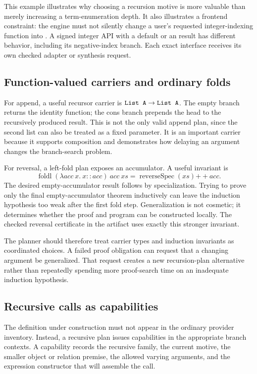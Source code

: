 \documentclass[11pt,letterpaper]{article}
\newcommand{\id}[1]{\texttt{\detokenize{#1}}}
\theoremstyle{definition}
\theoremstyle{remark}
\begin{document}
This example illustrates why choosing a recursion motive is more valuable than merely increasing a term-enumeration depth. It also illustrates a frontend constraint: the engine must not silently change a user's requested integer-indexing function into \id{lookupFin}. A signed integer API with a default or an \id{Option} result has different behavior, including its negative-index branch. Each exact interface receives its own checked adapter or synthesis request.

\subsection{Function-valued carriers and ordinary folds}

For append, a useful recursor carrier is $\id{List A} \to \id{List A}$. The empty branch returns the identity function; the cons branch prepends the head to the recursively produced result. This is not the only valid append plan, since the second list can also be treated as a fixed parameter. It is an important carrier because it supports composition and demonstrates how delaying an argument changes the branch-search problem.

For reversal, a left-fold plan exposes an accumulator. A useful invariant is
\[
 \operatorname{foldl}(\lambda acc\ x.\ x::acc)\ acc\ xs
   = \operatorname{reverseSpec}(xs)\mathbin{++}acc.
\]
The desired empty-accumulator result follows by specialization. Trying to prove only the final empty-accumulator theorem inductively can leave the induction hypothesis too weak after the first fold step. Generalization is not cosmetic; it determines whether the proof and program can be constructed locally. The checked reversal certificate in the artifact uses exactly this stronger invariant.

The planner should therefore treat carrier types and induction invariants as coordinated choices. A failed proof obligation can request that a changing argument be generalized. That request creates a new recursion-plan alternative rather than repeatedly spending more proof-search time on an inadequate induction hypothesis.

\subsection{Recursive calls as capabilities}

The definition under construction must not appear in the ordinary provider inventory. Instead, a recursive plan issues capabilities in the appropriate branch contexts. A capability records the recursive family, the current motive, the smaller object or relation premise, the allowed varying arguments, and the expression constructor that will assemble the call.
\end{document}
